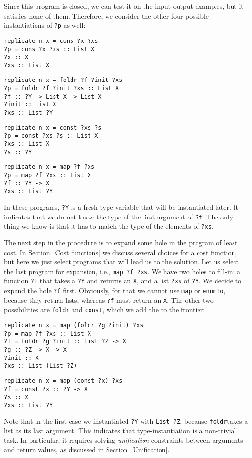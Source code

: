 Since this program is closed, we can test it on the input-output examples, but it satisfies none of them.  Therefore, we consider the other four possible instantiations of \lstinline!?p! as well:
\begin{lstlisting}[style=plain]
replicate n x = cons ?x ?xs
?p = cons ?x ?xs :: List X
?x :: X
?xs :: List X
\end{lstlisting}
\begin{lstlisting}[style=plain]
replicate n x = foldr ?f ?init ?xs
?p = foldr ?f ?init ?xs :: List X
?f :: ?Y -> List X -> List X
?init :: List X
?xs :: List ?Y
\end{lstlisting}
\begin{lstlisting}[style=plain]
replicate n x = const ?xs ?s
?p = const ?xs ?s :: List X
?xs :: List X
?s :: ?Y
\end{lstlisting}
\begin{lstlisting}[style=plain]
replicate n x = map ?f ?xs
?p = map ?f ?xs :: List X
?f :: ?Y -> X
?xs :: List ?Y
\end{lstlisting}
In these programs, \lstinline!?Y! is a fresh type variable that will be instantiated later.  It indicates that we do not know the type of the first argument of \lstinline!?f!. The only thing we know is that it has to match the type of the elements of \lstinline!?xs!.

The next step in the procedure is to expand some hole in the program of least cost.  In Section~\ref{Cost functions} we discuss several choices for a cost function, but here we just select programs that will lead us to the solution.  Let us select the last program for expansion, i.e., \lstinline|map ?f ?xs|.  We have two holes to fill-in: a function \lstinline!?f! that takes a \lstinline|?Y| and returns an \lstinline|X|, and a list \lstinline!?xs! of \lstinline|?Y|.  We decide to expand the hole \lstinline|?f| first.  Obviously, for that we cannot use \lstinline|map| or \lstinline|enumTo|, because they return lists, whereas \lstinline|?f| must return an \lstinline|X|.  The other two possibilities are \lstinline|foldr| and \lstinline|const|, which we add the to the frontier:

\begin{lstlisting}[style=plain]
replicate n x = map (foldr ?g ?init) ?xs
?p = map ?f ?xs :: List X
?f = foldr ?g ?init :: List ?Z -> X
?g :: ?Z -> X -> X
?init :: X
?xs :: List (List ?Z)
\end{lstlisting}

\begin{lstlisting}[style=plain]
replicate n x = map (const ?x) ?xs
?f = const ?x :: ?Y -> X
?x :: X
?xs :: List ?Y
\end{lstlisting}
Note that in the first case we instantiated \lstinline|?Y| with \lstinline|List ?Z|, because \lstinline|foldr|takes a list as its last argument.  This indicates that type-instantiation is a non-trivial task.  In particular, it requires solving \emph{unification} constraints between arguments and return values, as discussed in Section~\ref{Unification}.

